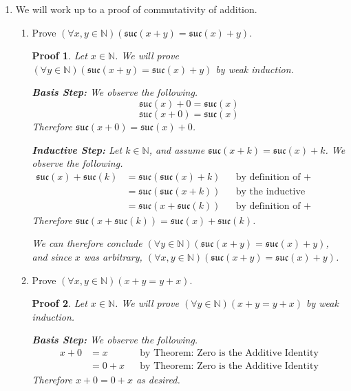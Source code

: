 \documentclass[12pt]{article}
\newcommand{\suc}{\mathfrak{suc}}
\newcommand{\N}{\mathbb{N}}
\theoremstyle{proofstyle}
\newtheorem*{proof*}{Proof}
\begin{document}
\begin{enumerate}[left=0pt, itemsep=2em, parsep=1em]
\newpage

\item We will work up to a proof of commutativity of addition.

\begin{enumerate}[label=(\alph*), itemsep=1.5em, leftmargin=2em]

  \item Prove $(\forall x, y \in \N)(\suc(x + y) = \suc(x) + y)$.

  \begin{proof*}
  Let $x \in \N$. We will prove $(\forall y \in \N)(\suc(x + y) = \suc(x) + y)$ by weak induction.

  \medskip
  \textbf{Basis Step:}
  We observe the following.
  \[
    \suc(x) + 0 = \suc(x) \tag{by definition of $+$}
  \]
  \[
    \suc(x + 0) = \suc(x) \tag{by definition of $+$}
  \]
  Therefore $\suc(x + 0) = \suc(x) + 0$.

  \medskip
  \textbf{Inductive Step:}
  Let $k \in \N$, and assume $\suc(x + k) = \suc(x) + k$. We observe the following.
  \begin{align*}
    \suc(x) + \suc(k) &= \suc(\suc(x) + k) &&\text{by definition of }+ \\
                      &= \suc(\suc(x + k)) &&\text{by the inductive hypothesis}\\
                      &= \suc(x + \suc(k)) &&\text{by definition of }+
  \end{align*}
  Therefore $\suc(x + \suc(k)) = \suc(x) + \suc(k)$.

  We can therefore conclude $(\forall y \in \N)(\suc(x + y) = \suc(x) + y)$, and since $x$ was arbitrary, $(\forall x, y \in \N)(\suc(x + y) = \suc(x) + y)$.
  \end{proof*}

  \item Prove $(\forall x, y \in \N)(x + y = y + x)$.

  \begin{proof*}
  Let $x \in \N$. We will prove $(\forall y \in \N)(x + y = y + x)$ by weak induction.

  \medskip
  \textbf{Basis Step:}
  We observe the following.
  \begin{align*}
    x + 0 &= x &&\text{by Theorem: Zero is the Additive Identity} \\
          &= 0 + x &&\text{by Theorem: Zero is the Additive Identity}
  \end{align*}
  Therefore $x + 0 = 0 + x$ as desired.


\end{proof*}
\end{enumerate}
\end{enumerate}
\end{document}
